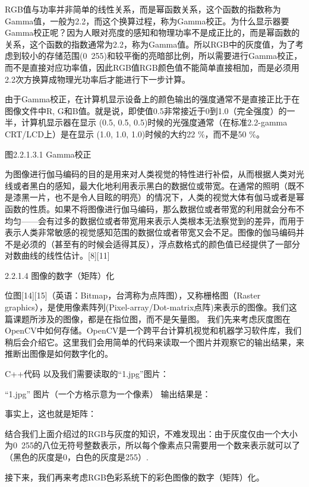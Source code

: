 	RGB值与功率并非简单的线性关系，而是幂函数关系，这个函数的指数称为Gamma值，一般为2.2，而这个换算过程，称为Gamma校正。为什么显示器要Gamma校正呢？因为人眼对亮度的感知和物理功率不是成正比的，而是幂函数的关系，这个函数的指数通常为2.2，称为Gamma值。所以RGB中的灰度值，为了考虑到较小的存储范围(0~255)和较平衡的亮暗部比例，所以需要进行Gamma校正，而不是直接对应功率值，因此RGB值RGB颜色值不能简单直接相加，而是必须用2.2次方换算成物理光功率后才能进行下一步计算。
	
	由于Gamma校正，在计算机显示设备上的颜色输出的强度通常不是直接正比于在图像文件中R, G和B值。就是说，即使值0.5非常接近于0到1.0（完全强度）的一半，计算机显示器在显示 (0.5, 0.5, 0.5)时候的光强度通常（在标准2.2-gamma CRT/LCD上）是在显示 (1.0, 1.0, 1.0)时候的大约22 \%，而不是50 \%。

图2.2.1.3.1 Gamma校正
	
	为图像进行伽马编码的目的是用来对人类视觉的特性进行补偿，从而根据人类对光线或者黑白的感知，最大化地利用表示黑白的数据位或带宽。在通常的照明（既不是漆黑一片，也不是令人目眩的明亮）的情况下，人类的视觉大体有伽马或者是幂函数的性质。如果不将图像进行伽马编码，那么数据位或者带宽的利用就会分布不均匀——会有过多的数据位或者带宽用来表示人类根本无法察觉到的差异，而用于表示人类非常敏感的视觉感知范围的数据位或者带宽又会不足。图像的伽马编码并不是必须的（甚至有的时候会适得其反），浮点数格式的颜色值已经提供了一部分对数曲线的线性估计。[8][11]

2.2.1.4 图像的数字（矩阵）化

	位图[14][15]（英语：Bitmap，台湾称为点阵图），又称栅格图（Raster graphics），是使用像素阵列(Pixel-array/Dot-matrix点阵)来表示的图像。我们这篇课题所涉及的图像，都是在指位图，而不是矢量图。
	我们先来考虑灰度图在OpenCV中如何存储。OpenCV是一个跨平台计算机视觉和机器学习软件库，我们稍后会介绍它。这里我们会用简单的代码来读取一个图片并观察它的输出结果，来推断出图像是如何数字化的。

C++代码
	以及我们需要读取的“1.jpg”图片：

“1.jpg” 图片（一个方格示意为一个像素）
	输出结果是：




事实上，这也就是矩阵：

	结合我们上面介绍过的RGB与灰度的知识，不难发现出：由于灰度仅由一个大小为0~255的八位无符号整数表示，所以每个像素点只需要用一个数来表示就可以了（黑色的灰度是0，白色的灰度是255）.

	接下来，我们再来考虑RGB色彩系统下的彩色图像的数字（矩阵）化。








